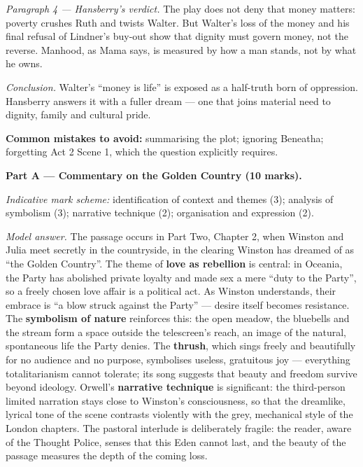 \documentclass[11pt]{article}
\begin{document}
\begin{corrige}
\emph{Paragraph 4 — Hansberry's verdict.} The play does not deny that money matters: poverty crushes Ruth and twists Walter. But Walter's loss of the money and his final refusal of Lindner's buy-out show that dignity must govern money, not the reverse. Manhood, as Mama says, is measured by how a man stands, not by what he owns.

\emph{Conclusion.} Walter's ``money is life'' is exposed as a half-truth born of oppression. Hansberry answers it with a fuller dream — one that joins material need to dignity, family and cultural pride.

\textbf{Common mistakes to avoid:} summarising the plot; ignoring Beneatha; forgetting Act 2 Scene 1, which the question explicitly requires.
\end{corrige}

\begin{corrige}
\textbf{Part A — Commentary on the Golden Country (10 marks).}

\emph{Indicative mark scheme:} identification of context and themes (3); analysis of symbolism (3); narrative technique (2); organisation and expression (2).

\emph{Model answer.} The passage occurs in Part Two, Chapter 2, when Winston and Julia meet secretly in the countryside, in the clearing Winston has dreamed of as ``the Golden Country''. The theme of \textbf{love as rebellion} is central: in Oceania, the Party has abolished private loyalty and made sex a mere ``duty to the Party'', so a freely chosen love affair is a political act. As Winston understands, their embrace is ``a blow struck against the Party'' — desire itself becomes resistance. The \textbf{symbolism of nature} reinforces this: the open meadow, the bluebells and the stream form a space outside the telescreen's reach, an image of the natural, spontaneous life the Party denies. The \textbf{thrush}, which sings freely and beautifully for no audience and no purpose, symbolises useless, gratuitous joy — everything totalitarianism cannot tolerate; its song suggests that beauty and freedom survive beyond ideology. Orwell's \textbf{narrative technique} is significant: the third-person limited narration stays close to Winston's consciousness, so that the dreamlike, lyrical tone of the scene contrasts violently with the grey, mechanical style of the London chapters. The pastoral interlude is deliberately fragile: the reader, aware of the Thought Police, senses that this Eden cannot last, and the beauty of the passage measures the depth of the coming loss.


\end{corrige}
\end{document}
